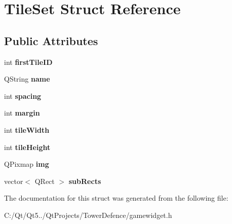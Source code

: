 \hypertarget{struct_tile_set}{}\section{Tile\+Set Struct Reference}
\label{struct_tile_set}
\subsection*{Public Attributes}
\begin{DoxyCompactItemize}
\item 
\hypertarget{struct_tile_set_ae360780d17980f4ae5c5db7f220092aa}{}int {\bfseries first\+Tile\+I\+D}\label{struct_tile_set_ae360780d17980f4ae5c5db7f220092aa}

\item 
\hypertarget{struct_tile_set_af5c095118116dd79296395d656982bf9}{}Q\+String {\bfseries name}\label{struct_tile_set_af5c095118116dd79296395d656982bf9}

\item 
\hypertarget{struct_tile_set_a2add7b9dff3d6c83df1f4a23096ea001}{}int {\bfseries spacing}\label{struct_tile_set_a2add7b9dff3d6c83df1f4a23096ea001}

\item 
\hypertarget{struct_tile_set_a55a34c405263221cc810131c50ad189f}{}int {\bfseries margin}\label{struct_tile_set_a55a34c405263221cc810131c50ad189f}

\item 
\hypertarget{struct_tile_set_a9ba9087a6da877f78af6cdf9afb0af7c}{}int {\bfseries tile\+Width}\label{struct_tile_set_a9ba9087a6da877f78af6cdf9afb0af7c}

\item 
\hypertarget{struct_tile_set_a9409211e1c5560f969b737714be977c0}{}int {\bfseries tile\+Height}\label{struct_tile_set_a9409211e1c5560f969b737714be977c0}

\item 
\hypertarget{struct_tile_set_aef650155dbba981488987a2a30aa9d12}{}Q\+Pixmap {\bfseries img}\label{struct_tile_set_aef650155dbba981488987a2a30aa9d12}

\item 
\hypertarget{struct_tile_set_aa6c5ae9dcb87d19f54c37c8204be43f2}{}vector$<$ Q\+Rect $>$ {\bfseries sub\+Rects}\label{struct_tile_set_aa6c5ae9dcb87d19f54c37c8204be43f2}

\end{DoxyCompactItemize}


The documentation for this struct was generated from the following file\+:\begin{DoxyCompactItemize}
\item 
C\+:/\+Qt/\+Qt5../\+Qt\+Projects/\+Tower\+Defence/gamewidget.\+h\end{DoxyCompactItemize}

